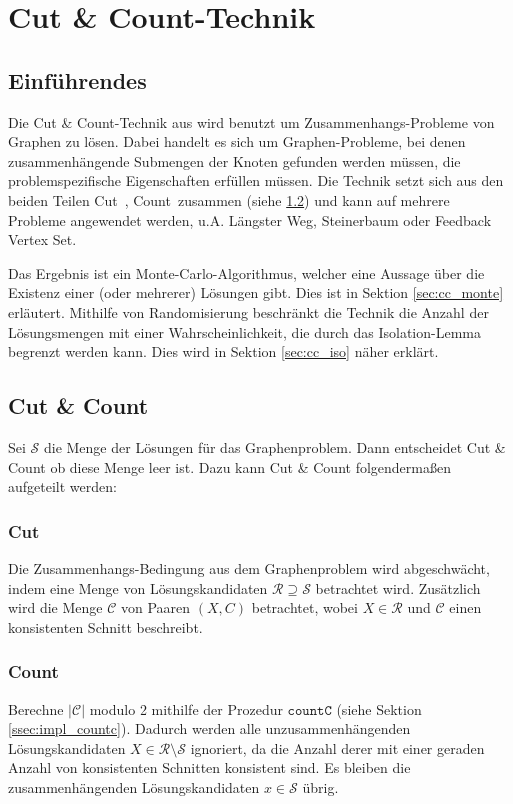 \chapter{Cut \& Count-Technik}
\label{c:cc_general}

\section{Einführendes}
\label{sec:cc_intro}
Die Cut \& Count-Technik aus \cite{cygan_solving_2011} wird benutzt um Zusammenhangs-Probleme von Graphen zu lösen.
Dabei handelt es sich um Graphen-Probleme, bei denen zusammenhängende Submengen der Knoten gefunden werden müssen, die problemspezifische  Eigenschaften erfüllen müssen. 
Die Technik setzt sich aus den beiden Teilen \glqq Cut\grqq ~, \glqq Count\grqq ~zusammen (siehe \ref{sec:cc_cc}) und kann auf mehrere Probleme angewendet werden, u.A. Längster Weg, Steinerbaum oder Feedback Vertex Set.

Das Ergebnis ist ein Monte-Carlo-Algorithmus, welcher eine Aussage über die Existenz einer (oder mehrerer) Lösungen gibt. Dies ist in Sektion \ref{sec:cc_monte} erläutert.
Mithilfe von Randomisierung beschränkt die Technik die Anzahl der Lösungsmengen mit einer Wahrscheinlichkeit, die durch das Isolation-Lemma begrenzt werden kann. Dies wird in Sektion \ref{sec:cc_iso} näher erklärt.


\section{Cut \& Count}
\label{sec:cc_cc}
Sei $\mathcal{S}$ die Menge der Lösungen für das Graphenproblem. 
Dann entscheidet Cut \& Count ob diese Menge leer ist. 
Dazu kann Cut \& Count folgendermaßen aufgeteilt werden:

\subsection{Cut}
\label{ssec:cc_cut}
Die Zusammenhangs-Bedingung aus dem Graphenproblem wird abgeschwächt, indem eine Menge von Lösungskandidaten $\mathcal{R} \supseteq \mathcal{S}$ betrachtet wird. 
Zusätzlich wird die Menge $\mathcal{C}$ von Paaren $(X,C)$ betrachtet, wobei $X \in \mathcal{R}$ und $\mathcal{C}$ einen konsistenten Schnitt beschreibt. 

\subsection{Count}
\label{ssec:cc_count}
Berechne $|\mathcal{C}|$ modulo 2 mithilfe der Prozedur $\mathtt{countC}$ (siehe Sektion \ref{ssec:impl_countc}). 
Dadurch werden alle unzusammenhängenden Lösungskandidaten $X \in \mathcal{R} \setminus \mathcal{S}$ ignoriert, da die Anzahl derer mit einer geraden Anzahl von konsistenten Schnitten konsistent sind. Es bleiben die zusammenhängenden Lösungskandidaten $x \in \mathcal{S}$ übrig. 

